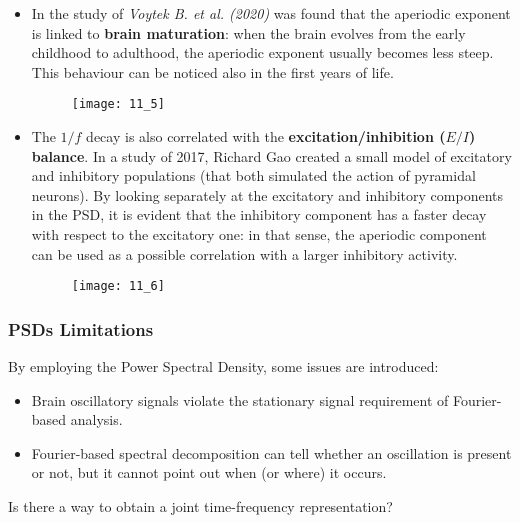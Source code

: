 \begin{itemize}
    \item In the study of \textit{Voytek B. et al. (2020)} was found that the aperiodic exponent is linked
          to \textbf{brain maturation}: when the brain evolves from the early childhood to adulthood, the
          aperiodic exponent usually becomes less steep. This behaviour can be noticed also in the first years
          of life.
          \begin{figure}[H]
              \texttt{[image: 11\_5]}
              \centering
          \end{figure}
    \item The \(1/f\) decay is also correlated with the \textbf{excitation/inhibition (\(E/I\)) balance}.
          In a study of 2017, Richard Gao created a small model of excitatory and inhibitory populations
          (that both simulated the action of pyramidal neurons). By looking separately at the excitatory
          and inhibitory components in the PSD, it is evident that the inhibitory component has a faster
          decay with respect to the excitatory one: in that sense, the aperiodic component can be used as
          a possible correlation with a larger inhibitory activity.
          \begin{figure}[H]
              \texttt{[image: 11\_6]}
              \centering
          \end{figure}
\end{itemize}
\subsubsection{PSDs Limitations}
By employing the Power Spectral Density, some issues are introduced:
\begin{itemize}
    \item Brain oscillatory signals violate the stationary signal requirement of Fourier-based analysis.
    \item Fourier-based spectral decomposition can tell whether an oscillation is present or not, but
          it cannot point out when (or where) it occurs.
\end{itemize}
Is there a way to obtain a joint time-frequency representation?

